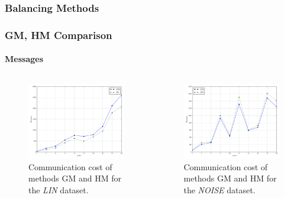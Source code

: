 \documentclass[hyperref={pdfpagelabels=false}]{beamer}
\begin{document}
\subsubsection*{Balancing Methods}
\begin{frame} \frametitle{GM, HM Comparison} \framesubtitle{Messages}
\begin{columns}
\begin{column}[t]{0.5\linewidth}
\begin{figure}
\vspace{-1cm}
\centering
  \includegraphics[scale=0.25]{../img/bal_msg_linear_nodes.pdf}
  \caption{Communication cost of methods GM and HM for the \emph{LIN} dataset.}
\end{figure}
\end{column}
\begin{column}[t]{0.5\linewidth}
\begin{figure}
\vspace{-1cm}
\centering
  \includegraphics[scale=0.25]{../img/bal_msg_noisyinterweaving_nodes.pdf}
  \caption{Communication cost of methods GM and HM for the \emph{NOISE} dataset.}
\end{figure}
\end{column}
\end{columns}
\end{frame}
\end{document}
